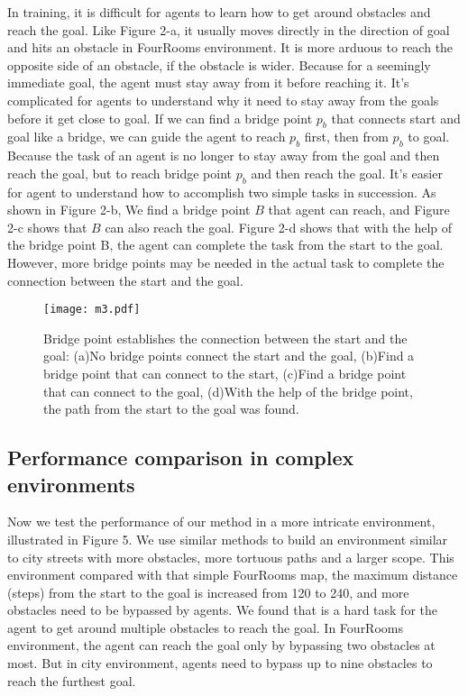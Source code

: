 \documentclass[8pt,twoside,a4paper]{article}
\begin{document}
\par In training, it is difficult for agents to learn how to get around obstacles and reach the goal. Like Figure 2-a, it usually moves directly in the direction of goal and hits an obstacle in FourRooms environment. It is more arduous to reach the opposite side of an obstacle, if the obstacle is wider. Because for a seemingly immediate goal, the agent must stay away from it before reaching it. It's complicated for agents to understand why it need to stay away from the goals before it get close to goal. If we can find a bridge point $p_{b}$ that connects start and goal like a bridge, we can guide the agent to reach $p_{b}$ first, then from $p_{b}$ to goal. Because the task of an agent is no longer to stay away from the goal and then reach the goal, but to reach bridge point $p_{b}$ and then reach the goal. It's easier for agent to understand how to accomplish two simple tasks in succession. As shown in Figure 2-b, We find a bridge point $B$ that agent can reach, and Figure 2-c shows that $B$ can also reach the goal. Figure 2-d shows that with the help of the bridge point B, the agent can complete the task from the start to the goal. However, more bridge points may be needed in the actual task to complete the connection between the start and the goal. 
\begin{figure}[htb]
\centering
{\texttt{[image: m3.pdf]}
\label{3}}
\caption{Bridge point establishes the connection between the start and the goal: (a)No bridge points connect the start and the goal, (b)Find a bridge point that can connect to the start, (c)Find a bridge point that can connect to the goal, (d)With the help of the bridge point, the path from the start to the goal was found.}
\end{figure}

\subsection{Performance comparison in complex environments}
Now we test the performance of our method in a more intricate environment, illustrated in Figure 5. We use similar methods to build an environment similar to city streets with more obstacles, more tortuous paths and a larger scope. This environment compared with that simple FourRooms map, the maximum distance (steps) from the start to the goal is increased from 120 to 240, and more obstacles need to be bypassed by agents. We found that is a hard task for the agent to get around multiple obstacles to reach the goal. In FourRooms environment, the agent can reach the goal only by bypassing two obstacles at most. But in city environment, agents need to bypass up to nine obstacles to reach the furthest goal. 
\end{document}
